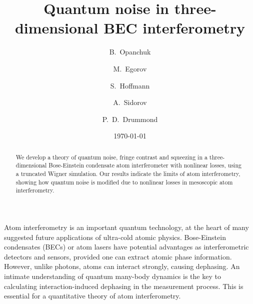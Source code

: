 \documentclass[aps,prl,twocolumn,showpacs,amsmath,amssymb,superscriptaddress,flushbottom,noraggedfooter]{revtex4-1}
\begin{document}
\title{Quantum noise in three-dimensional BEC interferometry}

\newcommand{\swinburneaffiliation}{Centre for Atom Optics and Ultrafast Spectroscopy, Swinburne University of Technology, Hawthorn, VIC 3122, Australia}
\newcommand{\uqaffiliation}{Physics Department, University of Queensland, Queensland, Australia}

\author{B.~Opanchuk}
\author{M.~Egorov}
\author{S.~Hoffmann}
\author{A.~Sidorov}
\author{P.~D.~Drummond}

\begin{abstract}
We develop a theory of quantum noise, fringe contrast and squeezing
in a three-dimensional Bose-Einstein condensate atom interferometer with nonlinear losses,
using a truncated Wigner simulation.
Our results indicate the limits of atom interferometry,
showing how quantum noise is modified due to nonlinear losses in mesoscopic atom interferometry.
\end{abstract}


\date{\today}

\maketitle

Atom interferometry is an important quantum technology,
at the heart of many suggested future applications of ultra-cold atomic physics.
Bose-Einstein condensates (BECs) or atom lasers have potential advantages as interferometric detectors and sensors,
provided one can extract atomic phase information.
However, unlike photons, atoms can interact strongly, causing dephasing.
An intimate understanding of quantum many-body dynamics is the key to calculating
interaction-induced dephasing in the measurement process.
This is essential for a quantitative theory of atom interferometry.
\end{document}
